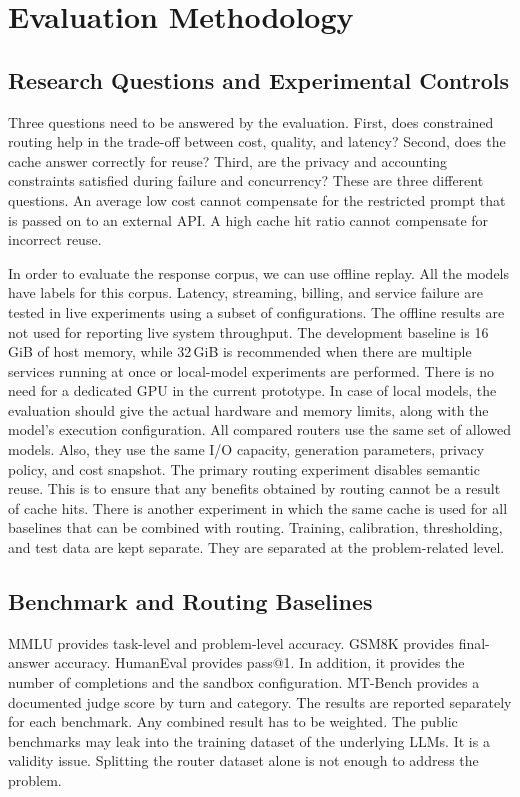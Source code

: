 \documentclass{FastFyp}
\begin{document}
\section{Evaluation Methodology}
\label{sec:evaluation}
\subsection{Research Questions and Experimental Controls}
Three questions need to be answered by the evaluation.
First, does constrained routing help in the trade-off between cost, quality, and latency?
Second, does the cache answer correctly for reuse?
Third, are the privacy and accounting constraints satisfied during failure and concurrency?
These are three different questions.
An average low cost cannot compensate for the restricted prompt that is passed on to an external API.
A high cache hit ratio cannot compensate for incorrect reuse.

In order to evaluate the response corpus, we can use offline replay.
All the models have labels for this corpus.
Latency, streaming, billing, and service failure are tested in live experiments using a subset of configurations.
The offline results are not used for reporting live system throughput.
The development baseline is 16\,GiB of host memory, while 32\,GiB is
recommended when there are multiple services running at once or local-model experiments are performed.
There is no need for a dedicated GPU in the current prototype. In case of local models, the
evaluation should give the actual hardware and memory limits, along with the model's execution configuration.
All compared routers use the same set of allowed models.
Also, they use the same I/O capacity, generation parameters, privacy policy, and cost snapshot.
The primary routing experiment disables semantic reuse.
This is to ensure that any benefits obtained by routing cannot be a result of cache hits.
There is another experiment in which the same cache is used for all baselines that can be combined with routing.
Training, calibration, thresholding, and test data are kept separate.
They are separated at the problem-related level.

\subsection{Benchmark and Routing Baselines}
MMLU provides task-level and problem-level accuracy.
GSM8K provides final-answer accuracy.
HumanEval provides pass@1.
In addition, it provides the number of completions and the sandbox configuration.
MT-Bench provides a documented judge score by turn and category.
The results are reported separately for each benchmark.
Any combined result has to be weighted.
The public benchmarks may leak into the training dataset of the underlying LLMs.
It is a validity issue.
Splitting the router dataset alone is not enough to address the problem.
\end{document}
